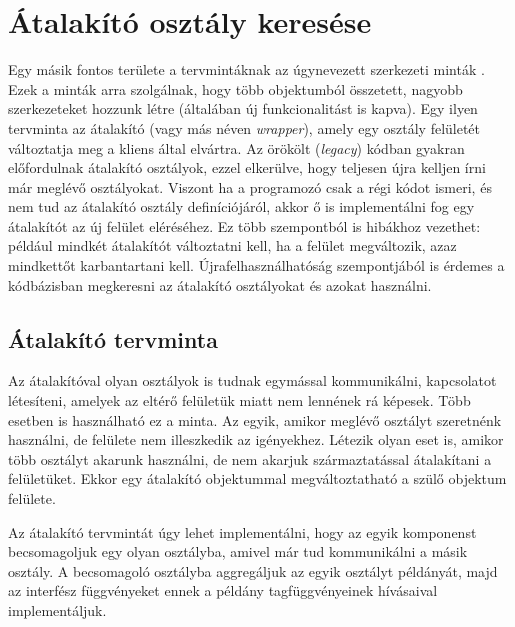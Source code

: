 \documentclass[a4paper,12pt]{report}
\begin{document}
\section{Átalakító osztály keresése}
Egy másik fontos területe a tervmintáknak az úgynevezett szerkezeti minták \cite{design_patterns}. Ezek a minták arra szolgálnak, hogy több objektumból összetett, nagyobb szerkezeteket hozzunk létre (általában új funkcionalitást is kapva). Egy ilyen tervminta az átalakító (vagy más néven \textit{wrapper}), amely egy osztály felületét változtatja meg a kliens által elvártra. Az örökölt (\textit{legacy}) kódban gyakran előfordulnak átalakító osztályok, ezzel elkerülve, hogy teljesen újra kelljen írni már meglévő osztályokat. Viszont ha a programozó csak a régi kódot ismeri, és nem tud az átalakító osztály definíciójáról, akkor ő is implementálni fog egy átalakítót az új felület eléréséhez. Ez több szempontból is hibákhoz vezethet: például mindkét átalakítót változtatni kell, ha a felület megváltozik, azaz mindkettőt karbantartani kell. Újrafelhasználhatóság szempontjából is érdemes a kódbázisban megkeresni az átalakító osztályokat és azokat használni.
\subsection{Átalakító tervminta}
Az átalakítóval olyan osztályok is tudnak egymással kommunikálni, kapcsolatot létesíteni, amelyek az eltérő felületük miatt nem lennének rá képesek. Több esetben is használható ez a minta. Az egyik, amikor meglévő osztályt szeretnénk használni, de felülete nem illeszkedik az igényekhez. Létezik olyan eset is, amikor több osztályt akarunk használni, de nem akarjuk származtatással átalakítani a felületüket. Ekkor egy átalakító objektummal megváltoztatható a szülő objektum felülete.
\par Az átalakító tervmintát úgy lehet implementálni, hogy az egyik komponenst becsomagoljuk egy olyan osztályba, amivel már tud kommunikálni a másik osztály. A becsomagoló osztályba aggregáljuk az egyik osztályt példányát, majd az interfész függvényeket ennek a példány tagfüggvényeinek hívásaival implementáljuk.
\end{document}
